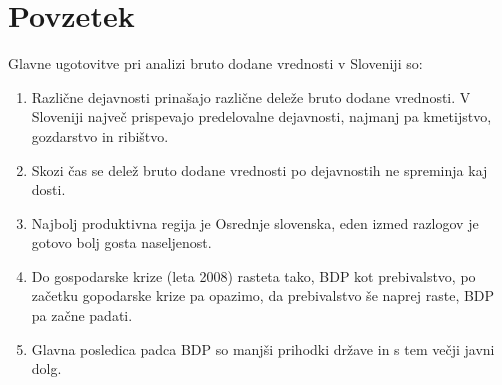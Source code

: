 \documentclass[a4paper, 11pt]{article}
\begin{document}
\section{Povzetek}
Glavne ugotovitve pri analizi bruto dodane vrednosti v Sloveniji so:
\begin{enumerate}
\item Različne dejavnosti prinašajo različne deleže bruto dodane vrednosti. V Sloveniji največ prispevajo predelovalne dejavnosti, najmanj pa kmetijstvo, gozdarstvo in ribištvo.
\item Skozi čas se delež bruto dodane vrednosti po dejavnostih ne spreminja kaj dosti.
\item Najbolj produktivna regija je Osrednje slovenska, eden izmed razlogov je gotovo bolj gosta naseljenost.
\item Do gospodarske krize (leta 2008) rasteta tako, BDP kot prebivalstvo, po začetku gopodarske krize pa opazimo, da prebivalstvo še naprej raste, BDP pa začne padati.
\item Glavna posledica padca BDP so manjši prihodki države in s tem večji javni dolg.
\end{enumerate}
\end{document}

